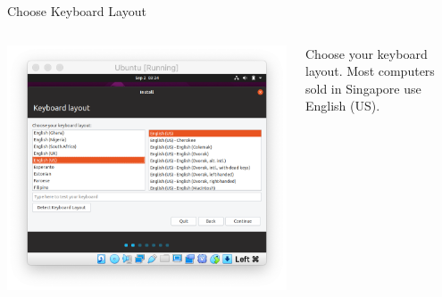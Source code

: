\documentclass[11pt]{beamer}
\begin{document}
\begin{frame}{Choose Keyboard Layout}
  \begin{columns}
    \begin{column}{0.65\linewidth}
      \includegraphics[width=\linewidth]{ubuntu-kb}
    \end{column}
    \begin{column}{0.35\linewidth}
      Choose your keyboard layout. Most computers sold in Singapore use English (US).
    \end{column}
  \end{columns}
\end{frame}
\end{document}
